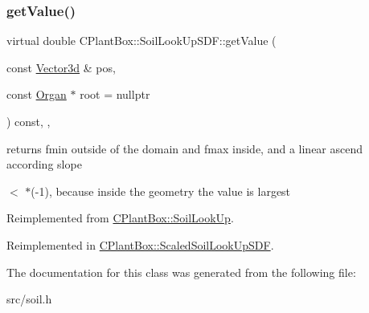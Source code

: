 \subsubsection{\texorpdfstring{get\+Value()}{getValue()}}
{\footnotesize\ttfamily virtual double C\+Plant\+Box\+::\+Soil\+Look\+Up\+S\+D\+F\+::get\+Value (\begin{DoxyParamCaption}\item[{const \hyperlink{classCPlantBox_1_1Vector3d}{Vector3d} \&}]{pos,  }\item[{const \hyperlink{classCPlantBox_1_1Organ}{Organ} $\ast$}]{root = {\ttfamily nullptr} }\end{DoxyParamCaption}) const\hspace{0.3cm}{\ttfamily [inline]}, {\ttfamily [override]}, {\ttfamily [virtual]}}



returns fmin outside of the domain and fmax inside, and a linear ascend according slope 

$<$ $\ast$(-\/1), because inside the geometry the value is largest 

Reimplemented from \hyperlink{classCPlantBox_1_1SoilLookUp_a46ace0d168532b6eb9bec8e6a1d64814}{C\+Plant\+Box\+::\+Soil\+Look\+Up}.



Reimplemented in \hyperlink{classCPlantBox_1_1ScaledSoilLookUpSDF_a3afdf16c07ae27a10602c74a9fac49b9}{C\+Plant\+Box\+::\+Scaled\+Soil\+Look\+Up\+S\+DF}.



The documentation for this class was generated from the following file\+:\begin{DoxyCompactItemize}
\item 
src/soil.\+h\end{DoxyCompactItemize}
